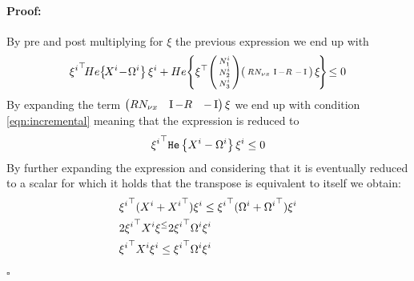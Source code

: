 \documentclass{ifacconf}
\theoremstyle{plain}
\newenvironment{proof}{\paragraph*{Proof:}}{\hfill$\square$}
\begin{document}
\begin{proof} By pre and post multiplying for $\xi$ the previous expression we end up with
$$
    {\xi^i}\tr\! He \!\left\{\!X^i \!-\! \Omega^i\right\} \xi^i + He\!\left\{ \xi\tr\! \smallpmat{N^i_1\\ N^i_2\\ N^i_3}\! \smallpmat{R N_{\nu x} & \Id - R & -\Id} \xi\! \right\}\! \leq 0
$$
By expanding the term $\left(\begin{matrix}R N_{\nu x} & \operatorname{I} - R & -\operatorname{I}\end{matrix}\right) \xi$ we end up with condition \eqref{eqn:incremental} meaning that the expression is reduced to
$$
    {\xi^i}^\top \texttt{\relax{He}}\left\{{X^i - \Omega^i}\right\} \xi^i \leq 0
$$
By further expanding the expression and considering that it is eventually reduced to a scalar for which it holds that the transpose is equivalent to itself we obtain:  
\begin{equation*}
\begin{aligned}
    &{\xi^i}^\top (X^i + {X^i}^\top) \xi^i \leq {\xi^i}^\top (\Omega^i + {\Omega^i}^\top) \xi^i\\
    &2 {\xi^i}^\top X^i\xi^ \leq 2 {\xi^i}^\top \Omega^i \xi^i\\
    & {\xi^i}^\top X^i \xi^i \leq {\xi^i}^\top \Omega^i \xi^i
\end{aligned}
\end{equation*}
\end{proof}
\end{document}

